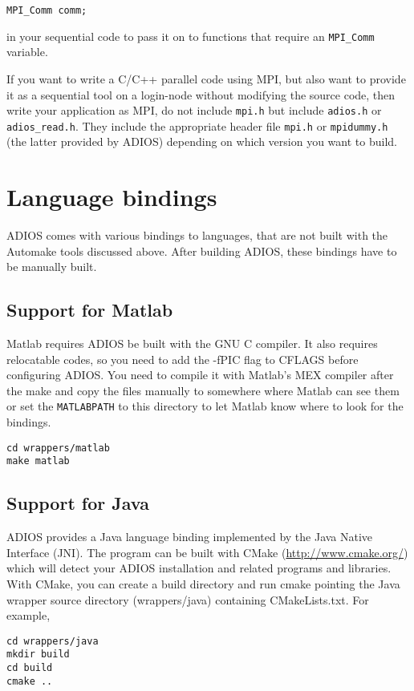 \verb+MPI_Comm comm;+

in your sequential code to pass it on to functions that require an \verb+MPI_Comm+ variable.

If you want to write a C/C++ parallel code using MPI, but also want to provide it as a
sequential tool on a login-node without modifying the source code, then write your
application as MPI, do not include \verb+mpi.h+ but include
\verb+adios.h+ or \verb+adios_read.h+.
They include the appropriate header file
\verb+mpi.h+ or \verb+mpidummy.h+
(the latter provided by ADIOS) depending on which version you want to build.


\section{Language bindings}

ADIOS comes with various bindings to languages, that are not built with the Automake tools discussed above. After building ADIOS, these bindings have to be manually built.

\subsection{Support for Matlab}
\label{section-install-matlab}

Matlab requires ADIOS be built with the GNU C compiler. It also requires relocatable
codes, so you need to add the -fPIC flag to CFLAGS before configuring ADIOS.
You need to compile it with Matlab's MEX compiler after the make and copy the files
manually to somewhere where Matlab can see them or set the \verb+MATLABPATH+ to this
directory to let Matlab know where to look for the bindings.

\begin{lstlisting}
cd wrappers/matlab
make matlab
\end{lstlisting}


\subsection{Support for Java}
\label{section-install-java}

ADIOS provides a Java language binding implemented by the Java Native Interface (JNI).
The program can be built with CMake (\url{http://www.cmake.org/}) which will detect your ADIOS installation and related programs and libraries. With CMake, you can create a build directory and run cmake pointing the Java wrapper source directory (wrappers/java) containing CMakeLists.txt. For example,
\begin{lstlisting}
cd wrappers/java
mkdir build
cd build
cmake ..
\end{lstlisting}

